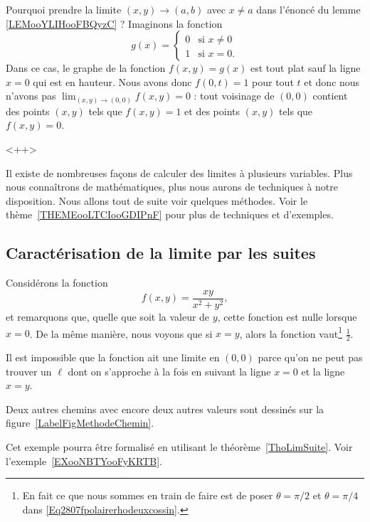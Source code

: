 \begin{example}     \label{EXooHSYNooBZhDbE}
    Pourquoi prendre la limite \( (x,y)\to (a,b)\) avec \( x\neq a\) dans l'énoncé du lemme \ref{LEMooYLIHooFBQyzC} ? Imaginons la fonction
    \begin{equation}
        g(x)=\begin{cases}
            0    &   \text{si } x\neq 0\\
            1    &    \text{si } x=0.
        \end{cases}
    \end{equation}
    Dans ce cas, le graphe de la fonction \( f(x,y)=g(x)\) est tout plat sauf la ligne \( x=0\) qui est en hauteur. Nous avons donc \( f(0,t)=1\) pour tout \( t\) et donc nous n'avons pas \( \lim_{(x,y)\to (0,0)} f(x,y)=0\) :  tout voisinage de \( (0,0)\) contient des points \( (x,y)\) tels que \( f(x,y)=1\) et des points \( (x,y)\) tels que \( f(x,y)=0\).
\end{example}
<++>

Il existe de nombreuses façons de calculer des limites à plusieurs variables. Plus nous connaîtrons de mathématiques, plus nous aurons de techniques à notre disposition. Nous allons tout de suite voir quelques méthodes. Voir le thème~\ref{THEMEooLTCIooGDIPnF} pour plus de techniques et d'exemples.

\subsection{Caractérisation de la limite par les suites}

\begin{example}		\label{ExFNExempleMethodeTrigigi}
	Considérons la fonction
	\begin{equation}
		f(x,y)=\frac{ xy }{ x^2+y^2 },
	\end{equation}
	et remarquons que, quelle que soit la valeur de $y$, cette fonction est nulle lorsque $x=0$. De la même manière, nous voyons que si $x=y$, alors la fonction vaut\footnote{En fait ce que nous sommes en train de faire est de poser $\theta=\pi/2$ et $\theta=\pi/4$ dans \eqref{Eq2807fpolairerhodeuxcossin}.} $\frac{ 1 }{2}$.

	Il est impossible que la fonction ait une limite en $(0,0)$ parce qu'on ne peut pas trouver un $\ell$ dont on s'approche à la fois en suivant la ligne $x=0$ et la ligne $x=y$.

	Deux autres chemins avec encore deux autres valeurs sont dessinés sur la figure~\ref{LabelFigMethodeChemin}.

    Cet exemple pourra être formalisé en utilisant le théorème~\ref{ThoLimSuite}. Voir l'exemple~\ref{EXooNBTYooFyKRTB}.
\end{example}

